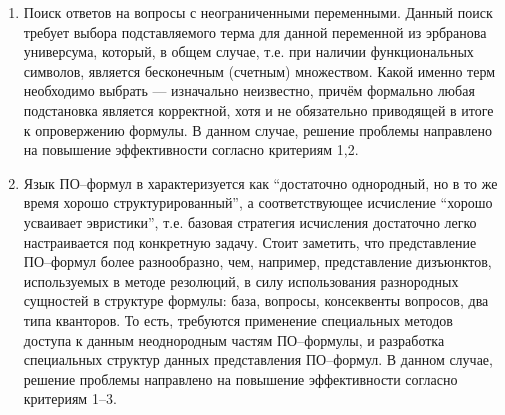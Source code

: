 \begin{enumerate}
\item {Поиск ответов на вопросы с неограниченными переменными.} Данный поиск требует выбора подставляемого терма для данной переменной из эрбранова универсума, который, в общем случае, т.е. при наличии функциональных символов, является бесконечным (счетным) множеством. Какой именно терм необходимо выбрать --- изначально неизвестно, причём формально любая подстановка является корректной, хотя и не обязательно приводящей в итоге к опровержению формулы. В данном случае, решение проблемы направлено на повышение эффективности согласно критериям 1,2.


\item Язык ПО--формул в \cite{ICDS2000} характеризуется как ``достаточно   однородный, но в то же время хорошо структурированный'', а соответствующее исчисление  ``хорошо усваивает эвристики'', т.е. базовая стратегия исчисления достаточно легко настраивается под конкретную задачу. Стоит заметить, что представление ПО--формул более разнообразно, чем, например, представление дизъюнктов, используемых в методе резолюций, в силу использования разнородных сущностей в структуре формулы: база, вопросы, консеквенты вопросов, два типа кванторов. То есть, требуются применение специальных методов доступа к данным неоднородным частям ПО--формулы, и разработка специальных структур данных представления ПО--формул. В данном случае, решение проблемы направлено на повышение эффективности согласно критериям 1--3.


\end{enumerate}
